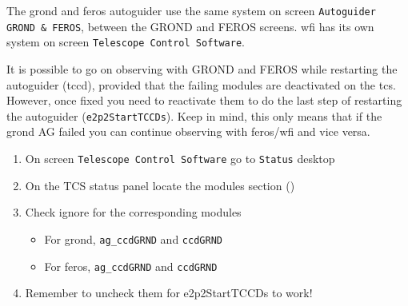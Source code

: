 \documentclass[11pt,fleqn,a4paper]{book}
\begin{document}
The \gls{grond} and \gls{feros} autoguider use the same system on screen \texttt{Autoguider GROND \& FEROS}, between the GROND and FEROS screens.  \gls{wfi} has its own system on screen \texttt{Telescope Control Software}.

It is possible to go on observing with GROND and FEROS while restarting the autoguider (\acrlong{tccd}), provided that the  failing modules are deactivated on the \gls{tcs}. However, once fixed you need to reactivate them to do the last step of restarting the autoguider (\texttt{e2p2StartTCCDs}). Keep in mind, this only means that if the \gls{grond} AG failed you can continue observing with \gls{feros}/\gls{wfi} and vice versa. 

\label{proc:agmodules}
\begin{enumerate}
    \item On screen \texttt{Telescope Control Software} go to \texttt{Status} \gls{desktop}
    \item On the \gls{TCS status panel} locate the modules section ()
    \item Check ignore for the corresponding modules
    \begin{itemize}
        \item For \gls{grond}, \texttt{ag\_ccdGRND} and \texttt{ccdGRND}
        \item For \gls{feros}, \texttt{ag\_ccdGRND} and \texttt{ccdGRND}
    \end{itemize}
    \item Remember to uncheck them for \gls{e2p2StartTCCDs} to work!
\end{enumerate}
\end{document}
